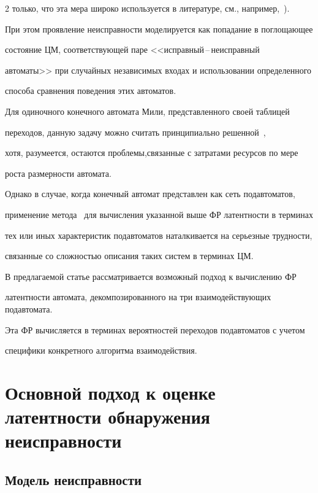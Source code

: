 \begin{multicols}{2}
только, что эта мера широко используется в литературе, см., например,~\cite{4, 7}).


При этом проявление неисправности моделируется как попадание в поглощающее


состояние ЦМ, соответствующей паре <<исправный\,--\,неисправный


автоматы>> при случайных независимых входах и использовании определенного


способа сравнения поведения этих автоматов.





 Для одиночного конечного автомата Мили, представленного своей таблицей


переходов, данную задачу можно считать принципиально решенной~\cite{4},


хотя, разумеется, остаются проблемы,\linebreak связанные с затратами ресурсов по мере


роста размерности автомата.


Однако в случае, когда конечный автомат представлен как сеть подавтоматов,


применение метода~\cite{4} для вычисления указанной выше ФР латентности в терминах


тех или иных характеристик подавтоматов наталкивается на серьез\-ные трудности,


связанные со сложностью описания таких систем в терминах ЦМ.





 В предлагаемой статье рассматривается возможный подход к вычислению ФР


латентности автомата, декомпозированного на три взаимо\-дей\-ст\-ву\-ющих подавтомата.


Эта ФР вычисляется в терминах вероятностей переходов подавтоматов с учетом


специфики конкретного алгоритма взаимодействия.





\section{Основной подход к оценке латентности обнаружения неисправности}





\subsection{Модель неисправности}






\end{multicols}
